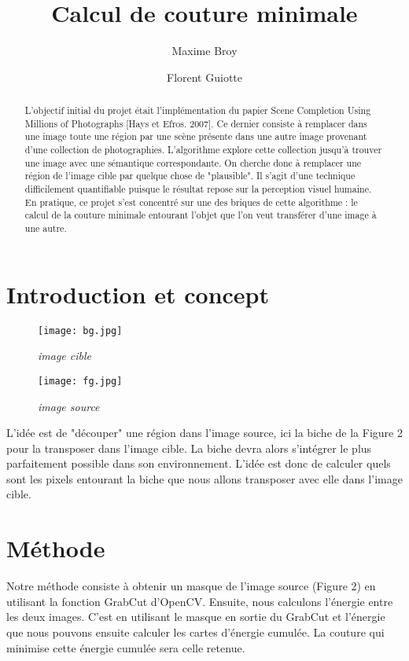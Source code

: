 \documentclass[a4paper]{article}
\title{Calcul de couture minimale}
\author{Maxime Broy \and Florent Guiotte}
\date{}
\begin{document}
\begin{abstract}
L'objectif initial du projet était l'implémentation du papier Scene Completion Using Millions of Photographs [Hays et Efros. 2007]. Ce dernier consiste à remplacer dans une image toute une région par une scène présente dans une autre image provenant d'une collection de photographies. L'algorithme explore cette collection jusqu'à trouver une image avec une sémantique correspondante. On cherche donc à remplacer une région de l'image cible par quelque chose de "plausible". Il s'agit d'une technique difficilement quantifiable puisque le résultat repose sur la perception visuel humaine. En pratique, ce projet s'est concentré sur une des briques de cette algorithme : le calcul de la couture minimale entourant l'objet que l'on veut transférer d'une image à une autre. 
\end{abstract}




\section{Introduction et concept}               %

\begin{figure}[!h]
	\begin{minipage}[b]{0.40\linewidth}
    	\centering \texttt{[image: bg.jpg]}
    	\caption{\it image cible}
    \end{minipage}\hfill
    \begin{minipage}[b]{0.40\linewidth}
    	\centering \texttt{[image: fg.jpg]}
    	\caption{\it image source}
    \end{minipage}\hfill
\end{figure}

L'idée est de "découper" une région dans l'image source, ici la biche de la Figure 2 pour la transposer dans l'image cible. La biche devra alors s'intégrer le plus parfaitement possible dans son environnement. L'idée est donc de calculer quels sont les pixels entourant la biche que nous allons transposer avec elle dans l'image cible.

\section{Méthode}         
Notre méthode consiste à obtenir un masque de l'image source (Figure 2) en utilisant la fonction GrabCut d'OpenCV. Ensuite, nous calculons l'énergie entre les deux images. C'est en utilisant le masque en sortie du GrabCut et l'énergie que nous pouvons ensuite calculer les cartes d'énergie cumulée. La couture qui minimise cette énergie cumulée sera celle retenue.
\end{document}
